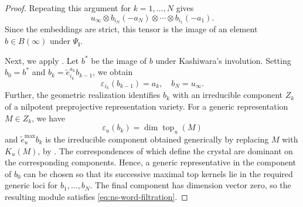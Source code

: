 \documentclass[11pt,reqno]{amsart}
\theoremstyle{definition}
\theoremstyle{remark}
\begin{document}
\begin{proof}
Repeating this argument for $k=1,\ldots,N$ gives
\[
u_\infty\otimes b_{i_N}(-a_N)
\otimes\cdots\otimes b_{i_1}(-a_1).
\]
Since the embeddings are strict, this tensor is the image of an
element $b\in B(\infty)$ under $\Psi_{\mathbf i}$.

Next, we apply \cite[Thm.~3.2.2]{KS97}.
 Let $b^*$ be the image of $b$ under Kashiwara's involution. Setting $b_0=b^*$ and
$b_k=\widetilde e_{i_k}^{a_k}b_{k-1}$, we obtain
\[
\varepsilon_{i_k}(b_{k-1})=a_k,\quad b_N=u_\infty.
\]
Further, the geometric realization \cite[Thm.~5.3.2]{KS97} identifies $b_k$ with
an irreducible component $Z_k$ of a nilpotent preprojective representation
variety. For a generic representation $M\in Z_k$, we have
$$\varepsilon_u(b_k)=\dim\operatorname{top}_u(M)$$ and
$\widetilde e_u^{\max}b_k$ is  the irreducible
component obtained generically by replacing $M$ with $K_u(M)$,
by \cite[\S5.1, Prop.~5.2.4]{KS97}.
The correspondences of \cite[Lem.~5.2.3]{KS97} which define the crystal are dominant on the
corresponding components. Hence, a generic representative in the
component of $b_0$ can be chosen so that its successive maximal top
kernels lie in the required generic loci for $b_1,\ldots,b_N$.
%
The final component has dimension vector zero, so the resulting module
satisfies \eqref{eq:ns-word-filtration}.
\end{proof}
\end{document}
